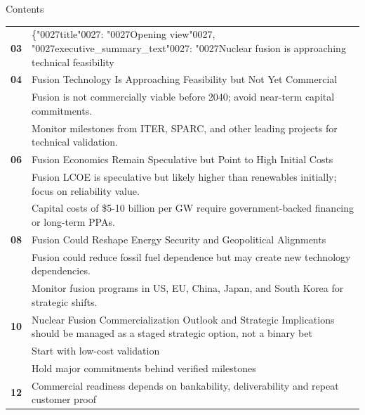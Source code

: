 \documentclass[10pt,a4paper]{article}
\newcommand{\BOApos}{{\BOQuoteFont\char"0027}}
\begin{document}
\clearpage
{\sffamily\fontsize{26}{31}\selectfont\color{BONavy} Contents}\par\vspace{10pt}
\begin{tabularx}{\linewidth}{p{14mm}Y}
\textcolor{BOGreen}{\bfseries 03} & \{\BOApos{}title\BOApos{}: \BOApos{}Opening view\BOApos{}, \BOApos{}executive\_summary\_text\BOApos{}: \BOApos{}Nuclear fusion is approaching technical feasibility \\[7pt]
\textcolor{BOGreen}{\bfseries 04} & Fusion Technology Is Approaching Feasibility but Not Yet Commercial \\[5pt]
 & {\scriptsize\color{BOMuted} Fusion is not commercially viable before 2040; avoid near-term capital commitments.} \\[1pt]
 & {\scriptsize\color{BOMuted} Monitor milestones from ITER, SPARC, and other leading projects for technical validation.} \\[1pt]
\textcolor{BOGreen}{\bfseries 06} & Fusion Economics Remain Speculative but Point to High Initial Costs \\[5pt]
 & {\scriptsize\color{BOMuted} Fusion LCOE is speculative but likely higher than renewables initially; focus on reliability value.} \\[1pt]
 & {\scriptsize\color{BOMuted} Capital costs of \$5-10 billion per GW require government-backed financing or long-term PPAs.} \\[1pt]
\textcolor{BOGreen}{\bfseries 08} & Fusion Could Reshape Energy Security and Geopolitical Alignments \\[5pt]
 & {\scriptsize\color{BOMuted} Fusion could reduce fossil fuel dependence but may create new technology dependencies.} \\[1pt]
 & {\scriptsize\color{BOMuted} Monitor fusion programs in US, EU, China, Japan, and South Korea for strategic shifts.} \\[1pt]
\textcolor{BOGreen}{\bfseries 10} & Nuclear Fusion Commercialization Outlook and Strategic Implications should be managed as a staged strategic option, not a binary bet \\[5pt]
 & {\scriptsize\color{BOMuted} Start with low-cost validation} \\[1pt]
 & {\scriptsize\color{BOMuted} Hold major commitments behind verified milestones} \\[1pt]
\textcolor{BOGreen}{\bfseries 12} & Commercial readiness depends on bankability, deliverability and repeat customer proof \\[5pt]

\end{tabularx}
\end{document}
